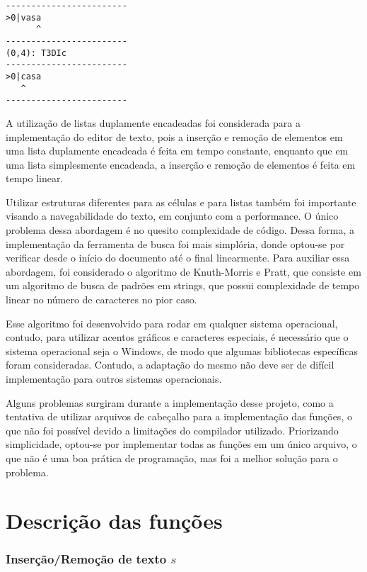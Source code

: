 \documentclass[a4paper, 11pt]{article}
\begin{document}
\begin{lstlisting}[caption={Exemplo de composição de funções}, label={list_exemplo_de_composicao}, language={[ansi]C},firstnumber=1]
------------------------
>0|vasa
      ^
------------------------
(0,4): T3DIc
------------------------
>0|casa
   ^
------------------------
\end{lstlisting}

A utilização de listas duplamente encadeadas foi considerada para a implementação do editor de texto, pois a inserção e remoção de elementos em uma lista duplamente encadeada é feita em tempo constante, enquanto que em uma lista simplesmente encadeada, a inserção e remoção de elementos é feita em tempo linear. 

Utilizar estruturas diferentes para as células e para listas também foi importante visando a navegabilidade do texto, em conjunto com a performance. O único problema dessa abordagem é no quesito complexidade de código. Dessa forma, a implementação da ferramenta de busca foi mais simplória, donde optou-se por verificar desde o início do documento até o final linearmente. Para auxiliar essa abordagem, foi considerado o algoritmo de Knuth-Morris e Pratt, que consiste em um algoritmo de busca de padrões em strings, que possui complexidade de tempo linear no número de caracteres no pior caso.

Esse algoritmo foi desenvolvido para rodar em qualquer sistema operacional, contudo, para utilizar acentos gráficos e caracteres especiais, é necessário que o sistema operacional seja o Windows, de modo que algumas bibliotecas específicas foram consideradas. Contudo, a adaptação do mesmo não deve ser de difícil implementação para outros sistemas operacionais.

Alguns problemas surgiram durante a implementação desse projeto, como a tentativa de utilizar arquivos de cabeçalho para a implementação das funções, o que não foi possível devido a limitações do compilador utilizado. Priorizando simplicidade, optou-se por implementar todas as funções em um único arquivo, o que não é uma boa prática de programação, mas foi a melhor solução para o problema.


\section{Descrição das funções}

\subsubsection*{Inserção/Remoção de texto \texorpdfstring{$s$}{s}}
\end{document}
